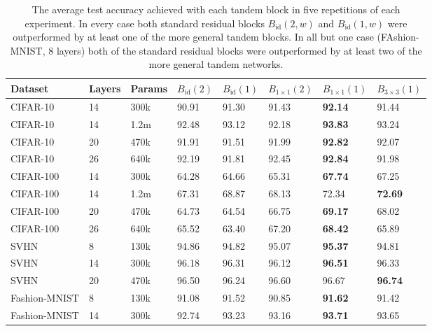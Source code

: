\documentclass{article} %
\begin{document}
\begin{table}[htb]
\centering
\begin{tabular}{|l l l|l l l l l|}
\hline
Dataset       & Layers & Params & $B_{\operatorname{id}}(2)$ & $B_{\operatorname{id}}(1)$ & $B_{1\times 1}(2)$ & $B_{1\times 1}(1)$ & $B_{3\times 3}(1)$ \\
\hline
CIFAR-10      & 14 & 300k & 90.91 & 91.30 & 91.43 & \textbf{\color{green!70!black} 92.14} & 91.44 \\
\hline
CIFAR-10      & 14 & 1.2m & 92.48 & 93.12 & 92.18 & \textbf{\color{green!70!black} 93.83} & 93.24 \\
\hline
CIFAR-10      & 20 & 470k & 91.91 & 91.51 & 91.99 & \textbf{\color{green!70!black} 92.82} & 92.07 \\
\hline
CIFAR-10      & 26 & 640k & 92.19 & 91.81 & 92.45 & \textbf{\color{green!70!black} 92.84} & 91.98 \\
\hline
CIFAR-100     & 14 & 300k & 64.28 & 64.66 & 65.31 & \textbf{\color{green!70!black} 67.74} & 67.25 \\
\hline
CIFAR-100     & 14 & 1.2m & 67.31 & 68.87 & 68.13 & 72.34 & \textbf{\color{green!70!black} 72.69} \\
\hline
CIFAR-100     & 20 & 470k & 64.73 & 64.54 & 66.75 & \textbf{\color{green!70!black} 69.17} & 68.02 \\
\hline
CIFAR-100     & 26 & 640k & 65.52 & 63.40 & 67.20 & \textbf{\color{green!70!black} 68.42} & 65.89 \\
\hline
SVHN          & 8  & 130k & 94.86 & 94.82 & 95.07 & \textbf{\color{green!70!black} 95.37} & 94.81 \\
\hline
SVHN          & 14 & 300k & 96.18 & 96.31 & 96.12 & \textbf{\color{green!70!black} 96.51} & 96.33 \\
\hline
SVHN          & 20 & 470k & 96.50 & 96.24 & 96.60 & 96.67 & \textbf{\color{green!70!black} 96.74} \\
\hline
Fashion-MNIST & 8  & 130k & 91.08 & 91.52 & 90.85 & \textbf{\color{green!70!black} 91.62} & 91.42 \\
\hline
Fashion-MNIST & 14 & 300k & 92.74 & 93.23 & 93.16 & \textbf{\color{green!70!black} 93.71} & 93.65 \\
\hline
\end{tabular}
\captionsetup{width=\linewidth}
\caption{The average test accuracy achieved with each tandem block in five repetitions of each experiment. In every case both standard residual blocks $B_{\operatorname{id}}(2,w)$ and $B_{\operatorname{id}}(1,w)$ were outperformed by at least one of the more general tandem blocks. In all but one case (FAshion-MNIST, 8 layers) both of the standard residual blocks were outperformed by at least two of the more general tandem networks.}\label{table:results}
\end{table}
\end{document}
